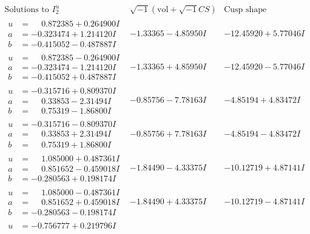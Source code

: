 \documentclass[1p]{elsarticle_modified}
\theoremstyle{definition}
\newcommand{\I}{\sqrt{-1}}
\begin{document}
$$\begin{array}{c|c|c}  
\text{Solutions to }I^u_{2}& \I (\text{vol} + \sqrt{-1}CS) & \text{Cusp shape}\\
 \hline 
\begin{aligned}
u &= \phantom{-}0.872385 + 0.264900 I \\
a &= -0.323474 + 1.214120 I \\
b &= -0.415052 - 0.487887 I\end{aligned}
 & -1.33365 - 4.85950 I & -12.45920 + 5.77046 I \\ \hline\begin{aligned}
u &= \phantom{-}0.872385 - 0.264900 I \\
a &= -0.323474 - 1.214120 I \\
b &= -0.415052 + 0.487887 I\end{aligned}
 & -1.33365 + 4.85950 I & -12.45920 - 5.77046 I \\ \hline\begin{aligned}
u &= -0.315716 + 0.809370 I \\
a &= \phantom{-}0.33853 - 2.31494 I \\
b &= \phantom{-}0.75319 - 1.86800 I\end{aligned}
 & -0.85756 - 7.78163 I & -4.85194 + 4.83472 I \\ \hline\begin{aligned}
u &= -0.315716 - 0.809370 I \\
a &= \phantom{-}0.33853 + 2.31494 I \\
b &= \phantom{-}0.75319 + 1.86800 I\end{aligned}
 & -0.85756 + 7.78163 I & -4.85194 - 4.83472 I \\ \hline\begin{aligned}
u &= \phantom{-}1.085000 + 0.487361 I \\
a &= \phantom{-}0.851652 - 0.459018 I \\
b &= -0.280563 + 0.198174 I\end{aligned}
 & -1.84490 - 4.33375 I & -10.12719 + 4.87141 I \\ \hline\begin{aligned}
u &= \phantom{-}1.085000 - 0.487361 I \\
a &= \phantom{-}0.851652 + 0.459018 I \\
b &= -0.280563 - 0.198174 I\end{aligned}
 & -1.84490 + 4.33375 I & -10.12719 - 4.87141 I \\ \hline\begin{aligned}
u &= -0.756777 + 0.219796 I \\

\end{aligned}
\end{array}$$
\end{document}
